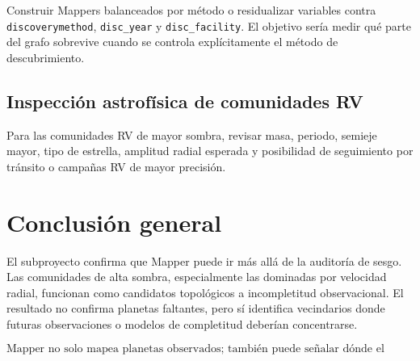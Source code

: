 \documentclass[11pt]{article}
\begin{document}
Construir Mappers balanceados por método o residualizar variables contra \texttt{discoverymethod}, \texttt{disc\_year} y \texttt{disc\_facility}. El objetivo sería medir qué parte del grafo sobrevive cuando se controla explícitamente el método de descubrimiento.

\subsection{Inspección astrofísica de comunidades RV}

Para las comunidades RV de mayor sombra, revisar masa, periodo, semieje mayor, tipo de estrella, amplitud radial esperada y posibilidad de seguimiento por tránsito o campañas RV de mayor precisión.

\section{Conclusión general}

El subproyecto confirma que Mapper puede ir más allá de la auditoría de sesgo. Las comunidades de alta sombra, especialmente las dominadas por velocidad radial, funcionan como candidatos topológicos a incompletitud observacional. El resultado no confirma planetas faltantes, pero sí identifica vecindarios donde futuras observaciones o modelos de completitud deberían concentrarse.

\[
\boxed{\text{Mapper no solo mapea planetas observados; también puede señalar dónde el catálogo deja sombras.}}
\]
\end{document}
